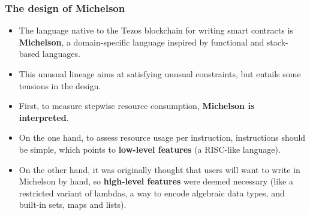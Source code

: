 \documentclass[compress,dvips,xcolor={dvipsnames},t]{beamer}
\begin{document}
\begin{frame}
  \frametitle{The design of Michelson}

  \begin{itemize}

    \item The language native to the Tezos blockchain for writing
      smart contracts is \textbf{Michelson}, a domain\hyp{}specific
      language inspired by functional and stack\hyp{}based languages.

    \item This unusual lineage aims at satisfying unusual constraints,
      but entails some tensions in the design.

    \item First, to measure stepwise resource consumption,
      \textbf{Michelson is interpreted}.

    \item On the one hand, to assess resource usage per instruction,
      instructions should be simple, which points to \textbf{low-level
        features} (a RISC-like language).

    \item On the other hand, it was originally thought that users will
      want to write in Michelson by hand, so \textbf{high-level
        features} were deemed necessary (like a restricted variant of
      lambdas, a way to encode algebraic data types, and built\hyp{}in
      sets, maps and lists).

  \end{itemize}

\end{frame}

\end{document}

